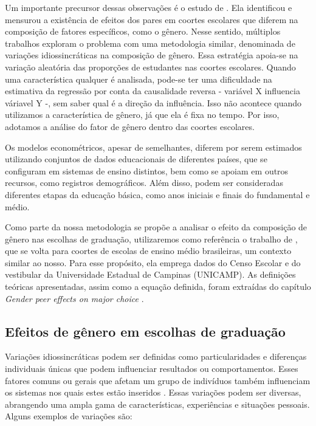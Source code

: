 Um importante precursor dessas observações é o estudo de \citet{Hoxby-2000}. Ela identificou e mensurou a existência de efeitos dos pares em coortes escolares que diferem na composição de fatores específicos, como o gênero. Nesse sentido, múltiplos trabalhos exploram o problema com uma metodologia similar, denominada de variações idiossincráticas na composição de gênero. Essa estratégia apoia-se na variação aleatória das proporções de estudantes nas coortes escolares. Quando uma característica qualquer é analisada, pode-se ter uma dificuldade na estimativa da regressão por conta da causalidade reversa - variável X influencia váriavel Y -, sem saber qual é a direção da influência. Isso não acontece quando utilizamos a característica de gênero, já que ela é fixa no tempo. Por isso, adotamos a análise do fator de gênero dentro das coortes escolares.

Os modelos econométricos, apesar de semelhantes, diferem por serem estimados utilizando conjuntos de dados educacionais de diferentes países, que se configuram em sistemas de ensino distintos, bem como se apoiam em outros recursos, como registros demográficos. Além disso, podem ser consideradas diferentes etapas da educação básica, como anos iniciais e finais do fundamental e médio. 

Como parte da nossa metodologia se propõe a analisar o efeito da composição de gênero nas escolhas de graduação, utilizaremos como referência o trabalho de \cite{Borges2021}, que se volta para coortes de escolas de ensino médio brasileiras, um contexto similar ao nosso. Para esse propósito, ela emprega dados do Censo Escolar e do vestibular da Universidade Estadual de Campinas (UNICAMP). As definições teóricas apresentadas, assim como a equação definida, foram extraídas do capítulo \textit{Gender peer effects on major choice} \autocite{Borges2021}. 

\subsection{Efeitos de gênero em escolhas de graduação}
Variações idiossincráticas podem ser definidas como particularidades e diferenças individuais únicas que podem influenciar resultados ou comportamentos. Esses fatores comuns ou gerais que afetam um grupo de indivíduos também influenciam os sistemas nos quais estes estão inseridos \autocite{Meister1991}. Essas variações podem ser diversas, abrangendo uma ampla gama de características, experiências e situações pessoais. Alguns exemplos de variações são:

